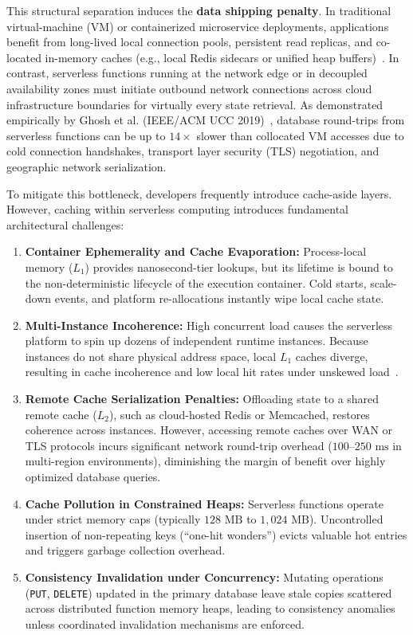 \documentclass[conference]{IEEEtran}
\begin{document}
This structural separation induces the \textbf{data shipping penalty}. In traditional virtual-machine (VM) or containerized microservice deployments, applications benefit from long-lived local connection pools, persistent read replicas, and co-located in-memory caches (e.g., local Redis sidecars or unified heap buffers)~\cite{dean2013}. In contrast, serverless functions running at the network edge or in decoupled availability zones must initiate outbound network connections across cloud infrastructure boundaries for virtually every state retrieval. As demonstrated empirically by Ghosh et al. (IEEE/ACM UCC 2019)~\cite{ghosh2019}, database round-trips from serverless functions can be up to $14\times$ slower than collocated VM accesses due to cold connection handshakes, transport layer security (TLS) negotiation, and geographic network serialization.

To mitigate this bottleneck, developers frequently introduce cache-aside layers. However, caching within serverless computing introduces fundamental architectural challenges:
\begin{enumerate}
    \item \textbf{Container Ephemerality and Cache Evaporation:} Process-local memory ($L_1$) provides nanosecond-tier lookups, but its lifetime is bound to the non-deterministic lifecycle of the execution container. Cold starts, scale-down events, and platform re-allocations instantly wipe local cache state.
    \item \textbf{Multi-Instance Incoherence:} High concurrent load causes the serverless platform to spin up dozens of independent runtime instances. Because instances do not share physical address space, local $L_1$ caches diverge, resulting in cache incoherence and low local hit rates under unskewed load~\cite{wang2018peeking}.
    \item \textbf{Remote Cache Serialization Penalties:} Offloading state to a shared remote cache ($L_2$), such as cloud-hosted Redis or Memcached, restores coherence across instances. However, accessing remote caches over WAN or TLS protocols incurs significant network round-trip overhead ($100\text{--}250\text{ ms}$ in multi-region environments), diminishing the margin of benefit over highly optimized database queries.
    \item \textbf{Cache Pollution in Constrained Heaps:} Serverless functions operate under strict memory caps (typically $128\text{ MB}$ to $1,024\text{ MB}$). Uncontrolled insertion of non-repeating keys (``one-hit wonders'') evicts valuable hot entries and triggers garbage collection overhead.
    \item \textbf{Consistency Invalidation under Concurrency:} Mutating operations (\texttt{PUT}, \texttt{DELETE}) updated in the primary database leave stale copies scattered across distributed function memory heaps, leading to consistency anomalies unless coordinated invalidation mechanisms are enforced.
\end{enumerate}
\end{document}
